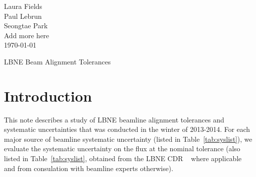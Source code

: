 



\begin{flushright}
Laura Fields\\
Paul Lebrun \\
Seongtae Park \\
Add more here \\
\today
\end{flushright}

\begin{center}

{\LARGE LBNE Beam Alignment Tolerances}
\end{center}



\section{Introduction}

This note describes a study of LBNE beamline alignment tolerances and systematic uncertainties that was conducted in the winter of 2013-2014.  For each major source of beamline systematic uncertainty (listed in Table~\ref{tab:syslist}), we evaluate the systematic uncertainty on the flux at the nominal tolerance (also listed in Table~\ref{tab:syslist}, obtained from the LBNE CDR ~\cite{lbnecdr} where applicable and from consulation with beamline experts otherwise).  

